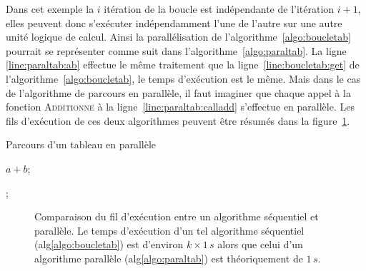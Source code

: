 Dans cet exemple la $i$ itération de la boucle est indépendante de l'itération $i+1$, elles peuvent donc s'exécuter indépendamment l'une de l'autre sur une autre unité logique de calcul. Ainsi la parallélisation de l'algorithme~\ref{algo:boucletab} pourrait se représenter comme suit dans l'algorithme~\ref{algo:paraltab}. La ligne \ref{line:paraltab:ab} effectue le même traitement que la ligne~\ref{line:boucletab:get} de l'algorithme~\ref{algo:boucletab}, le temps d'exécution est le même. Mais dans le cas de l'algorithme de parcours en parallèle, il faut imaginer que chaque appel à la fonction \textsc{Additionne} à la ligne~\ref{line:paraltab:calladd} s'effectue en parallèle. Les fils d'exécution de ces deux algorithmes peuvent être résumés dans la figure~\ref{fig:algoparsec}.

	\begin{algorithm}
		\caption{Parcours d'un tableau en parallèle}
		\label{algo:paraltab}
		\begin{algorithmic}[1]
				\State \Return $a + b$; \label{line:paraltab:ab}
			\EndFunction

					\State {}; \label{line:paraltab:calladd} 
				\EndFor
			\EndFunction
		\end{algorithmic}
	\end{algorithm}

	\begin{figure}[h]
		\centering
	  \hspace{5pt}
		\caption[Comparaison du fil d'exécution en séquentiel et parallèle]{Comparaison du fil d'exécution entre un algorithme séquentiel et parallèle. Le temps d'exécution d'un tel algorithme séquentiel (alg\ref{algo:boucletab}) est d'environ $k\times1\,s$ alors que celui d'un algorithme parallèle (alg\ref{algo:paraltab}) est théoriquement de $1\,s$.}
		\label{fig:algoparsec}
	\end{figure}

